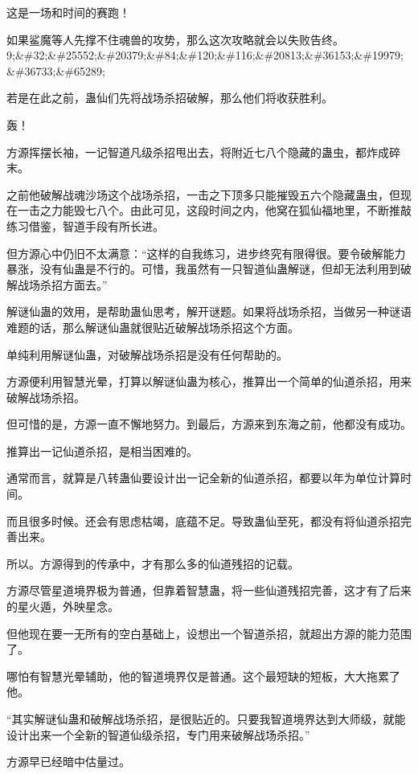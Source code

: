 
\begin{this_body}

这是一场和时间的赛跑！

如果鲨魔等人先撑不住魂兽的攻势，那么这次攻略就会以失败告终。9;\&\#32;\&\#25552;\&\#20379;\&\#84;\&\#120;\&\#116;\&\#20813;\&\#36153;\&\#19979;\&\#36733;\&\#65289;

若是在此之前，蛊仙们先将战场杀招破解，那么他们将收获胜利。

轰！

方源挥摆长袖，一记智道凡级杀招甩出去，将附近七八个隐藏的蛊虫，都炸成碎末。

之前他破解战魂沙场这个战场杀招，一击之下顶多只能摧毁五六个隐藏蛊虫，但现在一击之力能毁七八个。由此可见，这段时间之内，他窝在狐仙福地里，不断推敲练习借鉴，智道手段有所长进。

但方源心中仍旧不太满意：“这样的自我练习，进步终究有限得很。要令破解能力暴涨，没有仙蛊是不行的。可惜，我虽然有一只智道仙蛊解谜，但却无法利用到破解战场杀招方面去。”

解谜仙蛊的效用，是帮助蛊仙思考，解开谜题。如果将战场杀招，当做另一种谜语难题的话，那么解谜仙蛊就很贴近破解战场杀招这个方面。

单纯利用解谜仙蛊，对破解战场杀招是没有任何帮助的。

方源便利用智慧光晕，打算以解谜仙蛊为核心，推算出一个简单的仙道杀招，用来破解战场杀招。

但可惜的是，方源一直不懈地努力。到最后，方源来到东海之前，他都没有成功。

推算出一记仙道杀招，是相当困难的。

通常而言，就算是八转蛊仙要设计出一记全新的仙道杀招，都要以年为单位计算时间。

而且很多时候。还会有思虑枯竭，底蕴不足。导致蛊仙至死，都没有将仙道杀招完善出来。

所以。方源得到的传承中，才有那么多的仙道残招的记载。

方源尽管星道境界极为普通，但靠着智慧蛊，将一些仙道残招完善，这才有了后来的星火遁，外映星念。

但他现在要一无所有的空白基础上，设想出一个智道杀招，就超出方源的能力范围了。

哪怕有智慧光晕辅助，他的智道境界仅是普通。这个最短缺的短板，大大拖累了他。

“其实解谜仙蛊和破解战场杀招，是很贴近的。只要我智道境界达到大师级，就能设计出来一个全新的智道仙级杀招，专门用来破解战场杀招。”

方源早已经暗中估量过。


\end{this_body}
